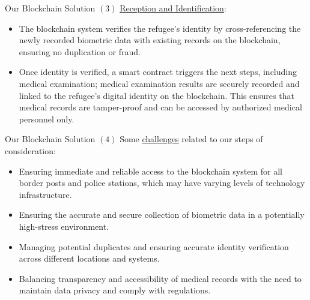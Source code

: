 \documentclass{beamer}
\begin{document}
\begin{frame}{Our Blockchain Solution $(3)$}
\underline{Reception and Identification}:
\begin{itemize}
		\item The blockchain system verifies the refugee's identity by cross-referencing the newly recorded biometric data with existing records on the blockchain, ensuring no duplication or fraud.
		\item Once identity is verified, a smart contract triggers the next steps, including medical examination; medical examination results are securely recorded and linked to the refugee's digital identity on the blockchain. This ensures that medical records are tamper-proof and can be accessed by authorized medical personnel only.
\end{itemize}

\end{frame}








\begin{frame}{Our Blockchain Solution $(4)$}
Some \underline{challenges} related to our steps of consideration:
\begin{itemize}
	\item Ensuring immediate and reliable access to the blockchain system for all border posts and police stations, which may have varying levels of technology infrastructure.
	\item Ensuring the accurate and secure collection of biometric data in a potentially high-stress environment.
	\item Managing potential duplicates and ensuring accurate identity verification across different locations and systems.
	\item Balancing transparency and accessibility of medical records with the need to maintain data privacy and comply with regulations.
\end{itemize}
\end{frame}
\end{document}
